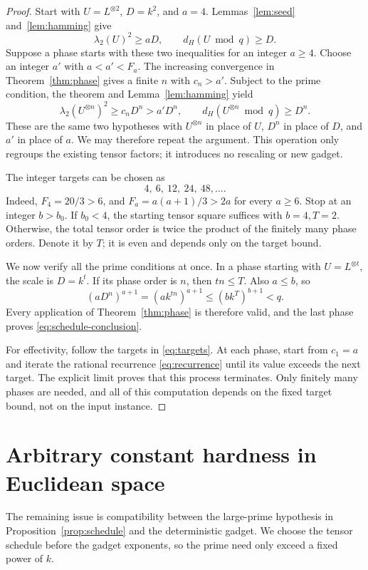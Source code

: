 \documentclass[11pt,letterpaper]{article}
\numberwithin{equation}{section}
\theoremstyle{definition}
\theoremstyle{remark}
\begin{document}
\begin{proof}
Start with $U=L^{\otimes2}$, $D=k^2$, and $a=4$. Lemmas~\ref{lem:seed} and~\ref{lem:hamming} give
\[
 \lambda_2(U)^2\ge aD,\qquad d_H(U\bmod q)\ge D.
\]
Suppose a phase starts with these two inequalities for an integer $a\ge4$. Choose an integer $a'$ with $a<a'<F_a$. The increasing convergence in Theorem~\ref{thm:phase} gives a finite $n$ with $c_n>a'$. Subject to the prime condition, the theorem and Lemma~\ref{lem:hamming} yield
\[
 \lambda_2(U^{\otimes n})^2\ge c_nD^n>a'D^n,
 \qquad d_H(U^{\otimes n}\bmod q)\ge D^n.
\]
These are the same two hypotheses with $U^{\otimes n}$ in place of $U$, $D^n$ in place of $D$, and $a'$ in place of $a$. We may therefore repeat the argument. This operation only regroups the existing tensor factors; it introduces no rescaling or new gadget.

The integer targets can be chosen as
\begin{equation}\label{eq:targets}
 4,\ 6,\ 12,\ 24,\ 48,\ldots.
\end{equation}
Indeed, $F_4=20/3>6$, and $F_a=a(a+1)/3>2a$ for every $a\ge6$. Stop at an integer $b>b_0$. If $b_0<4$, the starting tensor square suffices with $b=4,T=2$. Otherwise, the total tensor order is twice the product of the finitely many phase orders. Denote it by $T$; it is even and depends only on the target bound.

We now verify all the prime conditions at once. In a phase starting with $U=L^{\otimes t}$, the scale is $D=k^t$. If its phase order is $n$, then $tn\le T$. Also $a\le b$, so
\[
 (aD^n)^{a+1}
 =(ak^{tn})^{a+1}
 \le(bk^T)^{b+1}<q.
\]
Every application of Theorem~\ref{thm:phase} is therefore valid, and the last phase proves \eqref{eq:schedule-conclusion}.

For effectivity, follow the targets in \eqref{eq:targets}. At each phase, start from $c_1=a$ and iterate the rational recurrence \eqref{eq:recurrence} until its value exceeds the next target. The explicit limit proves that this process terminates. Only finitely many phases are needed, and all of this computation depends on the fixed target bound, not on the input instance.
\end{proof}

\section{Arbitrary constant hardness in Euclidean space}\label{sec:hardness}
The remaining issue is compatibility between the large-prime hypothesis in Proposition~\ref{prop:schedule} and the deterministic gadget. We choose the tensor schedule before the gadget exponents, so the prime need only exceed a fixed power of $k$.
\end{document}
